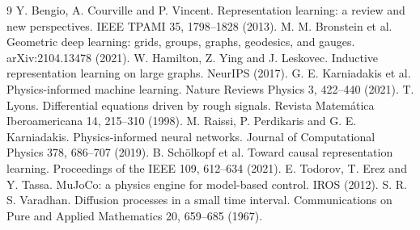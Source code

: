 \documentclass[11pt]{article}
\begin{document}
\begin{thebibliography}{9}
 Y. Bengio, A. Courville and P. Vincent. Representation learning: a review and new perspectives. IEEE TPAMI 35, 1798--1828 (2013).
 M. M. Bronstein et al. Geometric deep learning: grids, groups, graphs, geodesics, and gauges. arXiv:2104.13478 (2021).
 W. Hamilton, Z. Ying and J. Leskovec. Inductive representation learning on large graphs. NeurIPS (2017).
 G. E. Karniadakis et al. Physics-informed machine learning. Nature Reviews Physics 3, 422--440 (2021).
 T. Lyons. Differential equations driven by rough signals. Revista Matemática Iberoamericana 14, 215--310 (1998).
 M. Raissi, P. Perdikaris and G. E. Karniadakis. Physics-informed neural networks. Journal of Computational Physics 378, 686--707 (2019).
 B. Schölkopf et al. Toward causal representation learning. Proceedings of the IEEE 109, 612--634 (2021).
 E. Todorov, T. Erez and Y. Tassa. MuJoCo: a physics engine for model-based control. IROS (2012).
 S. R. S. Varadhan. Diffusion processes in a small time interval. Communications on Pure and Applied Mathematics 20, 659--685 (1967).
\end{thebibliography}
\end{document}
